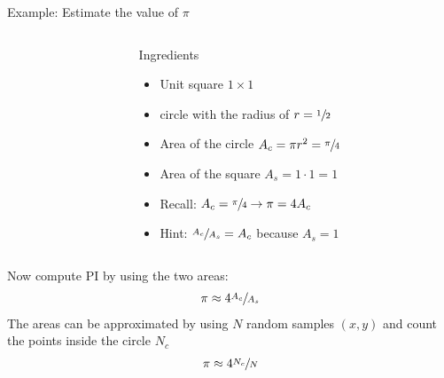 \documentclass[\classoption]{beamer}
\begin{document}
\begin{frame}{Example: Estimate the value of $\pi$}

\begin{columns}

\begin{column}{0.3\textwidth}
\centering
{}
\end{column}
\begin{column}{0.7\textwidth}
\begin{block}{Ingredients}
\begin{itemize}
\item Unit square $1\times 1$ 
\item circle with the radius of $r=\sfrac{1}{2}$
\item Area of the circle $A_c=\pi r^2 = \sfrac{\pi}{4} $ 
\item Area of the square $A_s = 1 \cdot 1 = 1$
\item Recall: $A_c=\sfrac{\pi}{4}\rightarrow \pi = 4A_c$
\item Hint:   $\sfrac{A_c}{A_s} = A_c$ because $A_s=1$
\end{itemize}
\end{block}
\end{column}
\end{columns}
Now compute PI by using the two areas:
\begin{align*}
\pi \approx 4 \sfrac{A_c}{A_s}
\end{align*}
The areas can be approximated by using $N$ random samples $(x,y)$ and count the points inside the circle $N_c$ 
\begin{align*}
\pi \approx 4 \sfrac{N_c}{N}
\end{align*}
\end{frame}
\end{document}

